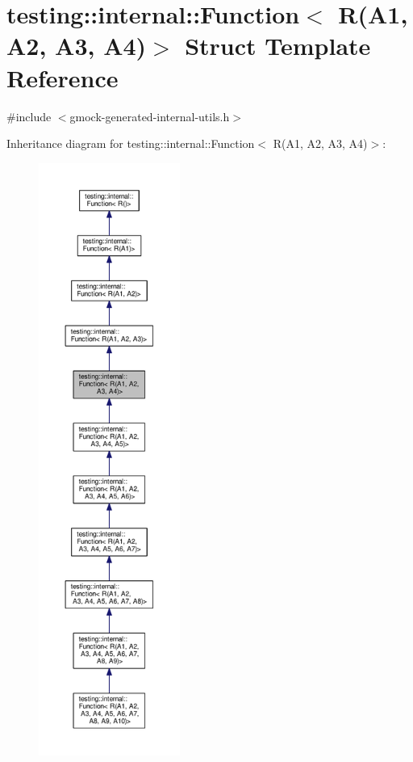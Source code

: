 \hypertarget{structtesting_1_1internal_1_1Function_3_01R_07A1_00_01A2_00_01A3_00_01A4_08_4}{}\section{testing\+:\+:internal\+:\+:Function$<$ R(A1, A2, A3, A4)$>$ Struct Template Reference}
\label{structtesting_1_1internal_1_1Function_3_01R_07A1_00_01A2_00_01A3_00_01A4_08_4}


{\ttfamily \#include $<$gmock-\/generated-\/internal-\/utils.\+h$>$}



Inheritance diagram for testing\+:\+:internal\+:\+:Function$<$ R(A1, A2, A3, A4)$>$\+:
\nopagebreak
\begin{figure}[H]
\begin{center}
\leavevmode
\includegraphics[height=550pt]{structtesting_1_1internal_1_1Function_3_01R_07A1_00_01A2_00_01A3_00_01A4_08_4__inherit__graph}
\end{center}
\end{figure}


